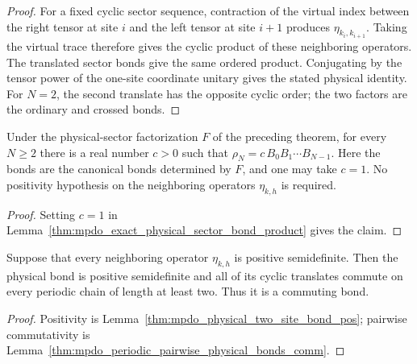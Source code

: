 \begin{proof}
    \leanok
    For a fixed cyclic sector sequence, contraction of the virtual index
    between the right tensor at site $i$ and the left tensor at site $i+1$
    produces $\eta_{k_i,k_{i+1}}$. Taking the virtual trace therefore gives
    the cyclic product of these neighboring operators. The
    translated sector bonds give the same ordered product. Conjugating by the
    tensor power of the one-site coordinate unitary gives the stated physical
    identity. For $N=2$, the second translate has the opposite cyclic order;
    the two factors are the ordinary and crossed bonds.
\end{proof}

\begin{lemma}
    \label{thm:mpdo_physical_sector_bond_product_unit_scalar}
    \leanok
    Under the physical-sector factorization $F$ of the preceding theorem,
    for every $N\geq2$ there is a real number $c>0$ such that
    $\rho_N=c\,B_0B_1\cdots B_{N-1}$.
    Here the bonds are the canonical bonds determined by $F$, and one may
    take $c=1$. No positivity hypothesis on the neighboring operators
    $\eta_{k,h}$ is required.
\end{lemma}

\begin{proof}
    \leanok
    Setting $c=1$ in
    Lemma~\ref{thm:mpdo_exact_physical_sector_bond_product} gives the claim.
\end{proof}

\begin{lemma}
    \label{thm:mpdo_positive_translation_invariant_bond_data}
    \leanok
    Suppose that every neighboring operator $\eta_{k,h}$ is positive
    semidefinite. Then the physical bond is positive semidefinite and all of
    its cyclic translates commute on every periodic chain of length at least
    two. Thus it is a commuting bond.
\end{lemma}

\begin{proof}
    \leanok
    Positivity is
    Lemma~\ref{thm:mpdo_physical_two_site_bond_pos}; pairwise commutativity
    is Lemma~\ref{thm:mpdo_periodic_pairwise_physical_bonds_comm}.
\end{proof}

